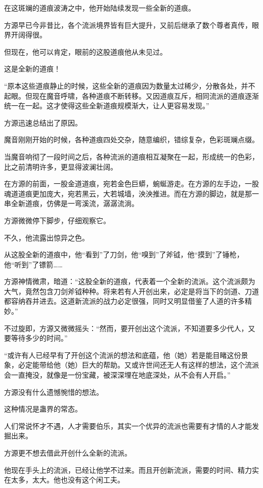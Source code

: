 \begin{this_body}
在这斑斓的道痕波涛之中，他开始陆续发现一些全新的道痕。

方源早已今非昔比，各个流派境界皆有巨大提升，又前后继承了数个尊者真传，眼界开阔得很。

但现在，他可以肯定，眼前的这股道痕他从未见过。

这是全新的道痕！

“原本这些道痕静止的时候，这些全新的道痕因为数量太过稀少，分散各处，并不起眼。但现在魔音呼啸，各种道痕不断转移。又因道痕互斥，相同流派的道痕逐渐统一在一起。这才使得这些全新道痕规模渐大，让人更容易发现。”

方源迅速总结出了原因。

魔音刚刚开始的时候，各种道痕四处交杂，随意编织，错综复杂，色彩斑斓点缀。

当魔音响彻了一段时间之后，各种流派的道痕相互凝聚在一起，形成统一的色彩，比之前清明许多，更显得波澜壮阔。

在方源的前面，一股金道道痕，宛若金色巨蟒，蜿蜒游走。在方源的左手边，一股魂道道痕更加庞大，宛若黑云，大若城墙，泱泱推进。而在方源的脚边，就是那一串全新道痕，仿佛是一弯溪流，潺潺流淌。

方源微微停下脚步，仔细观察它。

不久，他流露出惊异之色。

从这股全新的道痕中，他“看到”了刀剑，他“嗅到”了斧钺，他“摸到”了锤枪，他“听到”了镖箭……

方源神情微肃，暗道：“这股全新的道痕，代表着一个全新的流派。这个流派颇为大气，竟然包含刀剑斧钺种种。将来若有人开创出来，必定是将当下的剑道、刀道都容纳吞并进去。这道新流派的战力必定很强，同时又明显借鉴了人道的许多精妙。”

不过旋即，方源又微微摇头：“然而，要开创出这个流派，不知道要多少代人，又要等待多少的时间。”

“或许有人已经早有了开创这个流派的想法和底蕴，他（她）若是能目睹这份景象，必定能带给他（她）巨大的帮助。又或许世间还无人有这样的想法，这个流派会一直掩没，就像是一份宝藏，被深深埋在地底深处，从不会有人开启。”

方源没有什么遗憾惋惜的想法。

这种情况是蛊界的常态。

人们常说怀才不遇，人才需要伯乐，其实一个优异的流派也需要有才情的人才能发掘出来。

方源更不想去借此开创什么全新的流派。

他现在手头上的流派，已经让他学不过来。而且开创新流派，需要的时间、精力实在太多，太大。他也没有这个闲工夫。


\end{this_body}
